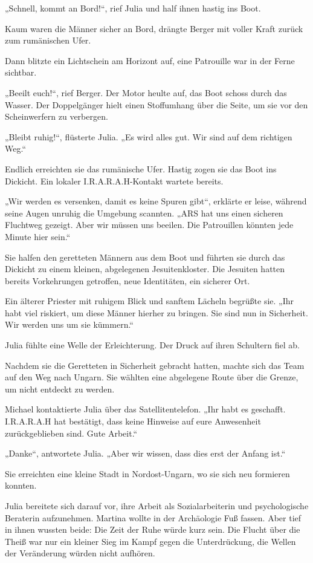 \documentclass[
]{article}
\begin{document}
„Schnell, kommt an Bord!{\kern0pt}``, rief Julia und half ihnen hastig ins Boot.

Kaum waren die Männer sicher an Bord, drängte Berger mit voller Kraft zurück zum rumänischen Ufer.

Dann blitzte ein Lichtschein am Horizont auf, eine Patrouille war in der Ferne sichtbar.

„Beeilt euch!{\kern0pt}``, rief Berger. Der Motor heulte auf, das Boot schoss durch das Wasser. Der Doppelgänger hielt einen Stoffumhang über die Seite, um sie vor den Scheinwerfern zu verbergen.

„Bleibt ruhig!{\kern0pt}``, flüsterte Julia. „Es wird alles gut. Wir sind auf dem richtigen Weg.``

Endlich erreichten sie das rumänische Ufer. Hastig zogen sie das Boot ins Dickicht. Ein lokaler I.R.A.R.A.H-Kontakt wartete bereits.

„Wir werden es versenken, damit es keine Spuren gibt``, erklärte er leise, während seine Augen unruhig die Umgebung scannten. „ARS hat uns einen sicheren Fluchtweg gezeigt. Aber wir müssen uns beeilen. Die Patrouillen könnten jede Minute hier sein.``

Sie halfen den geretteten Männern aus dem Boot und führten sie durch das Dickicht zu einem kleinen, abgelegenen Jesuitenkloster. Die Jesuiten hatten bereits Vorkehrungen getroffen, neue Identitäten, ein sicherer Ort.

Ein älterer Priester mit ruhigem Blick und sanftem Lächeln begrüßte sie. „Ihr habt viel riskiert, um diese Männer hierher zu bringen. Sie sind nun in Sicherheit. Wir werden uns um sie kümmern.``

Julia fühlte eine Welle der Erleichterung. Der Druck auf ihren Schultern fiel ab.

Nachdem sie die Geretteten in Sicherheit gebracht hatten, machte sich das Team auf den Weg nach Ungarn. Sie wählten eine abgelegene Route über die Grenze, um nicht entdeckt zu werden.

Michael kontaktierte Julia über das Satellitentelefon. „Ihr habt es geschafft. I.R.A.R.A.H hat bestätigt, dass keine Hinweise auf eure Anwesenheit zurückgeblieben sind. Gute Arbeit.``

„Danke``, antwortete Julia. „Aber wir wissen, dass dies erst der Anfang ist.``

Sie erreichten eine kleine Stadt in Nordost-Ungarn, wo sie sich neu formieren konnten.

Julia bereitete sich darauf vor, ihre Arbeit als Sozialarbeiterin und psychologische Beraterin aufzunehmen. Martina wollte in der Archäologie Fuß fassen. Aber tief in ihnen wussten beide: Die Zeit der Ruhe würde kurz sein. Die Flucht über die Theiß war nur ein kleiner Sieg im Kampf gegen die Unterdrückung, die Wellen der Veränderung würden nicht aufhören.
\end{document}
